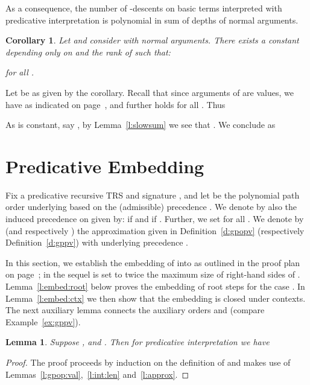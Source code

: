 \documentclass{LMCS}
\newtheorem{lemma}[thm]{Lemma}
\newtheorem{corollary}[thm]{Corollary}
\begin{document}
\noindent As a consequence, the number of -descents on 
basic terms interpreted with predicative interpretation  
is polynomial in sum of depths of normal arguments.

\begin{corollary}\label{c:pop}
  Let  and consider 
   with  normal arguments.
There exists a constant  depending only on  and 
  the rank of  such that:
  
  for all .
\end{corollary}
\proof
  Let  be as given by the corollary. 
  Recall that since arguments of  are values, we have  as indicated on page~\pageref{d:normonval}, 
  and further  holds for all .
  Thus
  
As  is constant, say , by Lemma~\ref{l:slowsum} we see that
  . 
We conclude as
  



\section{Predicative Embedding}\label{s:embed}

Fix a predicative recursive TRS  and signature , 
and let  be the polynomial path order underlying  
based on the (admissible) precedence .
We denote by  also the induced precedence on  
given by:  if  and  if .
Further, we set  for all .
We denote by  (and respectively ) the approximation 
given in Definition~\ref{d:gpopv} (respectively Definition~\ref{d:gppv}) with underlying precedence .

In this section, we establish the embedding of  into  as
outlined in the proof plan on page~\pageref{popstar:proofplan}; in the sequel
 is set to twice the maximum size of right-hand sides of .
Lemma~\ref{l:embed:root} below proves the embedding of root steps 
for the case . In Lemma~\ref{l:embed:ctx} we then show that the embedding is closed under contexts.
The next auxiliary lemma connects the auxiliary orders  and  (compare Example~\ref{ex:gppv}).

\begin{lemma}\label{l:embedgsq:root}
  Suppose ,  and . 
  Then for predicative interpretation 
  we have 
  
\end{lemma}
\begin{proof}
The proof proceeds by induction on the definition of  and makes
use of Lemmas~\ref{l:gpop:val},~\ref{l:int:len} and~\ref{l:approx}.
\end{proof}
\end{document}
